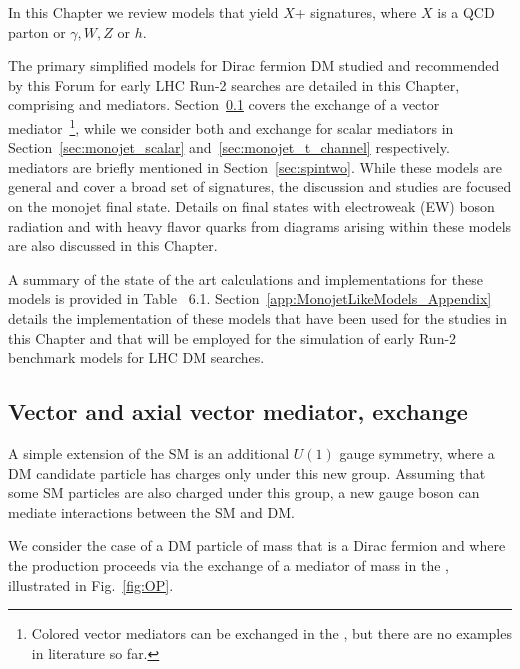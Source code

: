 In this Chapter we review 
models that yield $X$+\MET{} signatures,
where $X$ is a QCD parton or $\gamma, W, Z$ or $h$.

The primary simplified models for Dirac fermion DM studied and recommended by this Forum 
for early LHC Run-2 searches are detailed in this Chapter, 
comprising \spinzero and \spinone mediators. Section~\ref{sec:monojet_V} covers the
\schannel exchange of a vector mediator~\footnote{Colored vector mediators 
can be exchanged in the \tchannel, but there are no examples in literature so far.}, 
while we consider both \schannel and \tchannel exchange for scalar mediators in
Section~\ref{sec:monojet_scalar} and~\ref{sec:monojet_t_channel} respectively. 
\Spintwo mediators are briefly mentioned in Section~\ref{sec:spintwo}.
While these models are general and cover a broad set of signatures,
the discussion and studies are focused on the monojet final state. 
Details on final states with electroweak (EW) boson radiation and with heavy flavor quarks 
from diagrams arising within these models are also discussed in this Chapter.

A summary of the state of the art calculations and implementations for these models 
is provided in Table~%
6.1. Section~\ref{app:MonojetLikeModels_Appendix}
details the implementation of these models that
have been used for the studies in this Chapter and that will be employed
for the simulation of early Run-2 benchmark models for LHC DM searches. 


\subsection{Vector and axial vector mediator, \schannel exchange}
\label{sec:monojet_V}

A simple extension of the SM is an
additional $U(1)$ gauge symmetry, where a DM
candidate particle has charges only under this new group.
Assuming that some SM particles are also charged under
this group, a new gauge boson can mediate interactions
between the SM and DM.   

We consider the case of a DM particle \chiDM of mass \mdm that is a Dirac fermion and where the production 
proceeds via the exchange of a \spinone mediator of mass \mMed in
the \schannel, illustrated in Fig.~\ref{fig:OP}.

